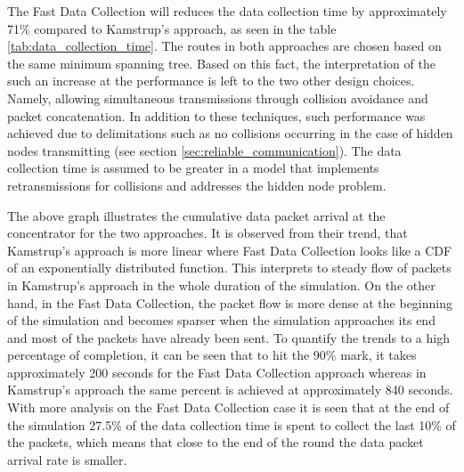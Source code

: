 The Fast Data Collection will reduces the data collection time by approximately 71\% compared to Kamstrup's approach, as seen in the table \ref{tab:data_collection_time}. The routes in both approaches are chosen based on the same minimum spanning tree. Based on this fact, the interpretation of the such an increase at the performance is left to the two other design choices. Namely, allowing simultaneous transmissions through collision avoidance and packet concatenation. In addition to these techniques, such performance was achieved due to delimitations such as no collisions occurring in the case of hidden nodes transmitting (see section \ref{sec:reliable_communication}). The data collection time is assumed to be greater in a model that implements retransmissions for collisions and addresses the hidden node problem.


The above graph illustrates the cumulative data packet arrival at the concentrator for the two approaches. It is observed from their trend, that Kamstrup's approach is more linear where Fast Data Collection looks like a CDF of an exponentially distributed function. This interprets to steady flow of packets in Kamstrup's approach in the whole duration of the simulation. On the other hand, in the Fast Data Collection, the packet flow is more dense at the beginning of the simulation and becomes sparser when the simulation approaches its end and most of the packets have already been sent. To quantify the trends to a high percentage of completion, it can be seen that to hit the 90\% mark, it takes approximately 200 seconds for the Fast Data Collection approach whereas in Kamstrup's approach the same percent is achieved at approximately 840 seconds. With more analysis on the Fast Data Collection case it is seen that at the end of the simulation 27.5\% of the data collection time is spent to collect the last 10\% of the packets, which means that close to the end of the round the data packet arrival rate is smaller.

